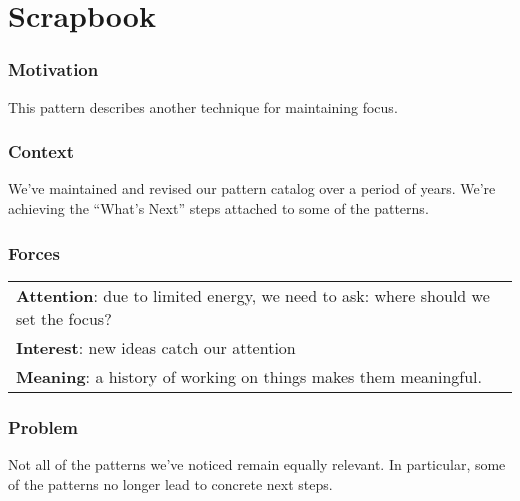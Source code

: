 \section{Scrapbook} \label{sec:Scrapbook}

\subsubsection*{Motivation} This pattern describes another technique for maintaining focus.  

\subsubsection*{Context} We've maintained and revised our pattern catalog over a period of years.  We're achieving
the ``What's Next'' steps attached to some of the patterns.

\subsubsection*{Forces}
\raisebox{-1.5\baselineskip}
{{\centering
\begin{tabular}{p{}}
\textbf{Attention}: due to limited energy, we need to ask: where should we set the focus?\\
\textbf{Interest}: new ideas catch our attention\\
\textbf{Meaning}: a history of working on things makes them meaningful.
\end{tabular}
}}

\subsubsection*{Problem} Not all of the patterns we've noticed remain equally relevant.  In particular, some of the patterns no longer lead to concrete next steps.

